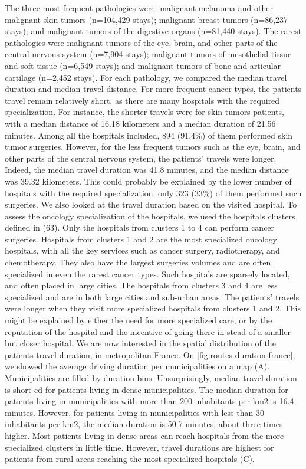 The three most frequent pathologies were: malignant melanoma and other malignant skin tumors (n=104,429 stays); malignant breast tumors (n=86,237 stays); and malignant tumors of the digestive organs (n=81,440 stays). The rarest pathologies were malignant tumors of the eye, brain, and other parts of the central nervous system (n=7,904 stays); malignant tumors of mesothelial tissue and soft tissue (n=6,549 stays); and malignant tumors of bone and articular cartilage (n=2,452 stays). For each pathology, we compared the median travel duration and median travel distance. For more frequent cancer types, the patients travel remain relatively short, as there are many hospitals with the required specialization. For instance, the shorter travels were for skin tumors patients, with a median distance of 16.18 kilometers and a median duration of 21.56 minutes. Among all the hospitals included, 894 (91.4\%) of them performed skin tumor surgeries. However, for the less frequent tumors such as the eye, brain, and other parts of the central nervous system, the patients' travels were longer. Indeed, the median travel duration was 41.8 minutes, and the median distance was 39.32 kilometers. This could probably be explained by the lower number of hospitals with the required specialization: only 323 (33\%) of them performed such surgeries. We also looked at the travel duration based on the visited hospital. To assess the oncology specialization of the hospitals, we used the hospitals clusters defined in (63). Only the hospitals from clusters 1 to 4 can perform cancer surgeries. Hospitals from clusters 1 and 2 are the most specialized oncology hospitals, with all the key services such as cancer surgery, radiotherapy, and chemotherapy. They also have the largest surgeries volumes and are often specialized in even the rarest cancer types. Such hospitals are sparsely located, and often placed in large cities. The hospitals from clusters 3 and 4 are less specialized and are in both large cities and sub-urban areas. The patients' travels were longer when they visit more specialized hospitals from clusters 1 and 2. This might be explained by either the need for more specialized care, or by the reputation of the hospital and the incentive of going there in-stead of a smaller but closer hospital.
We are now interested in the spatial distribution of the patients travel duration, in metropolitan France. On \cref{fig:routes-duration-france}, we showed the average driving duration per municipalities on a map (A). Municipalities are filled by duration bins. Unsurprisingly, median travel duration is short-ed for patients living in dense municipalities. The median duration for patients living in municipalities with more than 200 inhabitants per km2 is 16.4 minutes. However, for patients living in municipalities with less than 30 inhabitants per km2, the median duration is 50.7 minutes, about three times higher. Most patients living in dense areas can reach hospitals from the more specialized clusters in little time. However, travel durations are highest for patients from rural areas reaching the most specialized hospitals (C).


